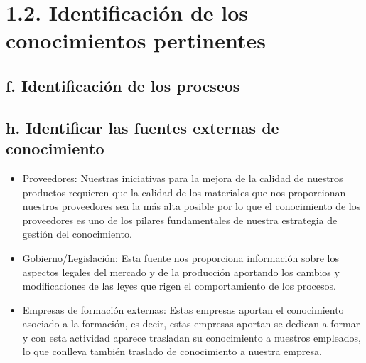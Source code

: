 \documentclass{article}
\newcounter{homeworkProblemCounter} %
\newcommand{\homeworkProblemName}{}
\newenvironment{homeworkProblem}[1][Parte \arabic{homeworkProblemCounter}]{ %
\stepcounter{homeworkProblemCounter} %
\renewcommand{\homeworkProblemName}{#1} %
\section{\homeworkProblemName} %

}
\newcommand{\homeworkSectionName}{}
\newenvironment{homeworkSection}[1][Parte \arabic{homeworkProblemCounter}]{ %
\renewcommand{\homeworkSectionName}{#1} %
\subsection{\homeworkSectionName} %
}{
}
\begin{document}
\begin{homeworkProblem}[1.2. Identificaci\'{o}n de los conocimientos pertinentes ]
\begin{homeworkSection}[f. Identificaci\'{o}n de los procseos]
\begin{itemize}
\end{itemize}
\end{homeworkSection}
\clearpage


\begin{homeworkSection}[h. Identificar las fuentes externas de conocimiento] %
\begin{itemize}
\item Proveedores: Nuestras iniciativas para la mejora de la calidad de nuestros productos requieren que la calidad de los materiales que nos proporcionan nuestros proveedores sea la m\'{a}s alta posible por lo que el conocimiento de los proveedores es uno de los pilares fundamentales de nuestra estrategia de gesti\'{o}n del conocimiento.
\item Gobierno/Legislaci\'{o}n: Esta fuente nos proporciona informaci\'{o}n sobre los aspectos legales del mercado y de la producci\'{o}n aportando los cambios y modificaciones de las leyes que rigen el comportamiento de los procesos.
\item Empresas de formaci\'{o}n externas: Estas empresas aportan el conocimiento asociado a la formaci\'{o}n, es decir, estas empresas aportan se dedican a formar y con esta actividad aparece trasladan su conocimiento a nuestros empleados, lo que conlleva tambi\'{e}n traslado de conocimiento a nuestra empresa.
\end{itemize}

\end{homeworkSection}
\end{homeworkProblem}
\clearpage
\end{document}
